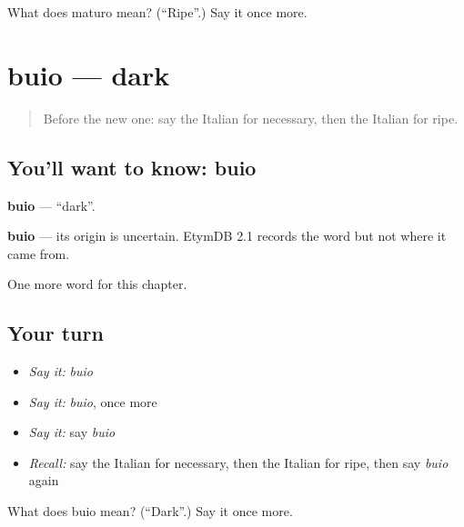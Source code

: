 \begin{tcolorbox}[breakable,colback=teal!4,colframe=teal!35!black,title={Before you move on}]
What does maturo mean? (\textquotedblleft{}Ripe\textquotedblright{}.) Say it once more.
\end{tcolorbox}
\section[buio]{buio — dark}

\label{lesson:IT-C158-buio}



\begin{quote}
Before the new one: say the Italian for necessary, then the Italian for ripe.
\end{quote}

\subsection*{You'll want to know: buio}
\textbf{buio} — \textquotedblleft{}dark\textquotedblright{}.

\begin{cousinweb}
\textbf{buio} — its origin is uncertain. EtymDB 2.1 records the word but not where it came from.
\end{cousinweb}

\begin{grammarlens}[title={What you've built}]
One more word for this chapter.
\end{grammarlens}

\subsection*{Your turn}
\begin{itemize}
\raggedright
  \item \emph{Say it:} \emph{buio}
  \item \emph{Say it:} \emph{buio}, once more
  \item \emph{Say it:} say \emph{buio}
  \item \emph{Recall:} say the Italian for necessary, then the Italian for ripe, then say \emph{buio} again
\end{itemize}

\begin{tcolorbox}[breakable,colback=teal!4,colframe=teal!35!black,title={Before you move on}]
What does buio mean? (\textquotedblleft{}Dark\textquotedblright{}.) Say it once more.
\end{tcolorbox}
